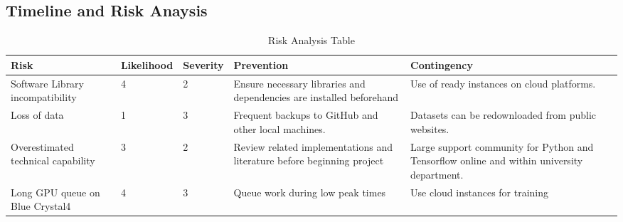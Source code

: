 \begin{landscape}
	\section{Timeline and Risk Anaysis }
	\begin{table}[H]
		
		\begin{tabular}{| p{5cm} | l | l | p{5cm} | p{5cm}| }
			\hline
			Risk & Likelihood & Severity & Prevention & Contingency \\ \hline 
			
			Software Library incompatibility & 4 & 2 & Ensure necessary libraries and dependencies are installed beforehand  &  Use of ready instances on cloud platforms.\\  \hline 
			
			Loss of data & 1 & 3 & Frequent backups to GitHub and other local machines. & Datasets can be redownloaded from public websites.  \\ \hline
			
			Overestimated technical capability & 3 & 2 & Review related implementations and literature before beginning project & Large support community for Python and Tensorflow online and within university department. \\ \hline 
			 
			
			Long GPU queue on Blue Crystal4 & 4 &3 & Queue work during low peak times & Use cloud instances for training \\ 
			\hline 
			
		\end{tabular}
		\caption{Risk Analysis Table}
		\label{table:risk analysis}
	\end{table}
	
\end{landscape}


\newpage

\begin{landscape}
	\begin{figure}
		
		\label{fig:timeline}
	\end{figure}
\end{landscape}



